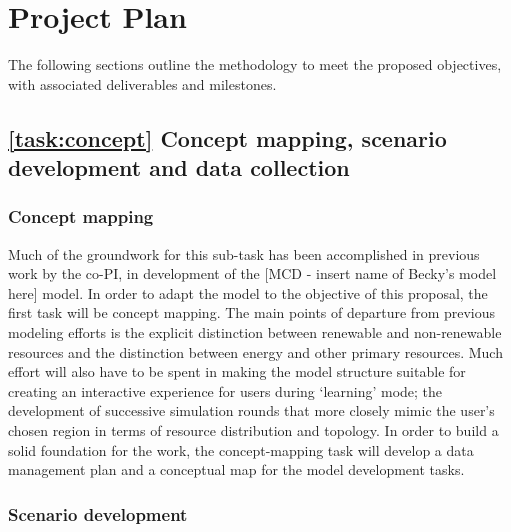 \documentclass[11pt,a4paper]{article}
\begin{document}


\section{Project Plan}

The following sections outline the methodology to meet the proposed objectives, with associated deliverables and milestones.

\subsection{\ref{task:concept} Concept mapping, scenario development and data collection}
\label{sec:task:concept}

\subsubsection{Concept mapping}

Much of the groundwork for this sub-task 
has been accomplished in previous work by the co-PI,
in development of the [MCD - insert name of Becky's model here] model.
In order to adapt the model to the objective of this proposal,
the first task will be concept mapping.
The main points of departure from previous modeling efforts
is the explicit distinction between renewable and non-renewable resources
and the distinction between energy and other primary resources.
Much effort will also have to be spent in making the model structure suitable for
creating an interactive experience for users during `learning' mode;
the development of successive simulation rounds 
that more closely mimic the user's chosen region
in terms of resource distribution and topology.
In order to build a solid foundation for the work, 
the concept-mapping task will develop
a data management plan and 
a conceptual map for the model development tasks.

\subsubsection{Scenario development}
\end{document}
